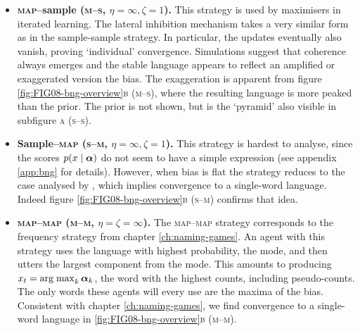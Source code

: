 \documentclass{../src/bcthesispart}
\begin{document}
\begin{itemize}
	

\item \textbf{\textsc{map}--sample (\textsc{m--s}, $\eta=\infty, \zeta=1$).}
	This strategy is used by maximisers in iterated learning. 
	The lateral inhibition mechanism takes a very similar form as in the sample-sample strategy.
	In particular, the updates eventually also vanish, proving ‘individual’ convergence.
	Simulations suggest that coherence always emerges and the stable language appears to reflect an amplified or exaggerated version the bias.
	The exaggeration is apparent from figure \ref{fig:FIG08-bng-overview}\textsc{b} (\textsc{m--s}), where the resulting language is more peaked than the prior.
	The prior is not shown, but is the ‘pyramid’ also visible in subfigure \textsc{a} (\textsc{s--s}). 


\item \textbf{Sample--\textsc{map} (\textsc{s--m}, $\eta=\infty, \zeta=1$).}
	This strategy is hardest to analyse, since the scores $p(x \mid \boldsymbol{\mathbf{\alpha}})$ do not seem to have a simple expression (see appendix \ref{app:bng} for details).
	However, when bias is flat the strategy reduces to the case analysed by \textcite{DeVylder2006}, which implies convergence to a single-word language.
	Indeed figure \ref{fig:FIG08-bng-overview}\textsc{b} (\textsc{s--m}) confirms that idea.
	 
\item  \textbf{\textsc{map}--\textsc{map} (\textsc{m--m}, $\eta=\zeta=\infty$).}
	The \textsc{map--map} strategy corresponds to the frequency strategy from chapter \ref{ch:naming-games}.
	An agent with this strategy uses the language with highest probability, the mode, and then utters the largest component from the mode. 
	This amounts to producing $x_t = \operatorname{arg\; max}_k \boldsymbol{\mathbf{\alpha}}_k$, the word with the highest counts, including pseudo-counts.
	The only words these agents will every use are the maxima of the bias.
	Consistent with chapter \ref{ch:naming-games}, we find convergence to a single-word language in \ref{fig:FIG08-bng-overview}\textsc{b} (\textsc{m--m}). 

\end{itemize}
\end{document}
